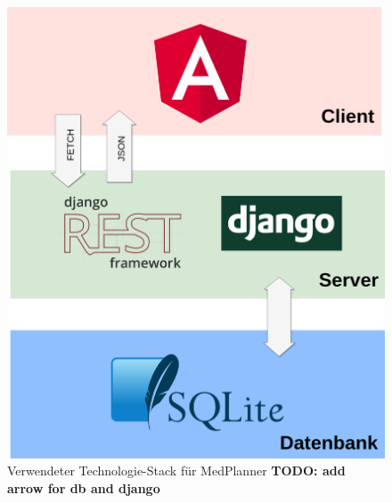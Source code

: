 \documentclass[conference]{IEEEtran}
\begin{document}
\begin{figure}[!h]
	\centering
	\includegraphics[width=0.7\columnwidth]{./figures/medplanner_stack}
	\caption{Verwendeter Technologie-Stack für MedPlanner \textbf{TODO: add arrow for db and django}}
\end{figure}
\end{document}

